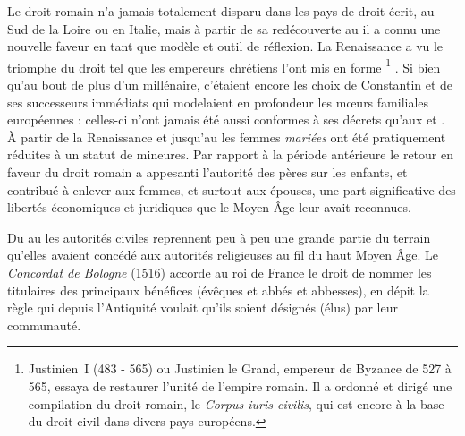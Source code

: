  Le droit romain n'a jamais totalement disparu dans les pays de droit écrit, au Sud de la Loire ou en Italie, mais à partir de sa redécouverte au  il a connu une nouvelle faveur en tant que modèle et outil de réflexion. La Renaissance a vu le triomphe du droit tel que les empereurs chrétiens l'ont mis en forme%
\footnote{Justinien~I\ier{} (483 - 565) ou Justinien le Grand, empereur de Byzance de 527 à 565, essaya de restaurer l'unité de l'empire romain. Il a ordonné et dirigé une compilation du droit romain, le \emph{Corpus iuris civilis}, qui est encore à la base du droit civil dans divers pays européens.}%
. Si bien qu'au bout de plus d'un millénaire, c'étaient encore les choix de Constantin et de ses successeurs immédiats qui modelaient en profondeur les mœurs familiales européennes : celles-ci n'ont jamais été aussi conformes à ses décrets qu'aux  et . À partir de la Renaissance et jusqu'au  les femmes \emph{mariées} ont été pratiquement réduites à un statut de mineures. Par rapport à la période antérieure le retour en faveur du droit romain a appesanti l'autorité des pères sur les enfants, et contribué à enlever aux femmes, et surtout aux épouses, une part significative des libertés économiques et juridiques que le Moyen Âge leur avait reconnues.

 Du  au  les autorités civiles reprennent peu à peu une grande partie du terrain qu'elles avaient concédé aux autorités religieuses au fil du haut Moyen Âge. Le \emph{Concordat de Bologne} (1516) accorde au roi de France le droit de nommer les titulaires des principaux bénéfices (évêques et abbés et abbesses), en dépit la règle qui depuis l'Antiquité voulait qu'ils soient désignés (élus) par leur communauté. 

